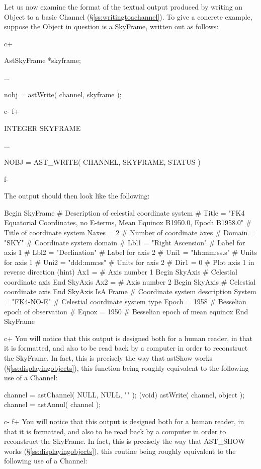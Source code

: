 \documentclass[twoside,11pt]{starlink}
\providecommand{\secref}[1]{\S\ref{#1}}
\begin{document}
{Let us now examine the format of the textual output produced by
writing an Object to a basic Channel
(\secref{ss:writingtoachannel}). To give a concrete example, suppose
the Object in question is a SkyFrame, written out as follows:

c+
\small
\begin{terminalv}
AstSkyFrame *skyframe;

...

nobj = astWrite( channel, skyframe );
\end{terminalv}
\normalsize
c-
f+
\small
\begin{terminalv}
      INTEGER SKYFRAME

      ...

      NOBJ = AST_WRITE( CHANNEL, SKYFRAME, STATUS )
\end{terminalv}
\normalsize
f-

The output should then look like the following:

\small
\begin{terminalv}
 Begin SkyFrame 	# Description of celestial coordinate system
#   Title = "FK4 Equatorial Coordinates, no E-terms, Mean Equinox B1950.0, Epoch B1958.0" 	# Title of coordinate system
    Naxes = 2 	# Number of coordinate axes
#   Domain = "SKY" 	# Coordinate system domain
#   Lbl1 = "Right Ascension" 	# Label for axis 1
#   Lbl2 = "Declination" 	# Label for axis 2
#   Uni1 = "hh:mm:ss.s" 	# Units for axis 1
#   Uni2 = "ddd:mm:ss" 	# Units for axis 2
#   Dir1 = 0 	# Plot axis 1 in reverse direction (hint)
    Ax1 = 	# Axis number 1
       Begin SkyAxis 	# Celestial coordinate axis
       End SkyAxis
    Ax2 = 	# Axis number 2
       Begin SkyAxis 	# Celestial coordinate axis
       End SkyAxis
 IsA Frame 	# Coordinate system description
    System = "FK4-NO-E" 	# Celestial coordinate system type
    Epoch = 1958 	# Besselian epoch of observation
#   Eqnox = 1950 	# Besselian epoch of mean equinox
 End SkyFrame
\end{terminalv}
\normalsize

c+
You will notice that this output is designed both for a human reader,
in that it is formatted, and also to be read back by a computer in
order to reconstruct the SkyFrame. In fact, this is precisely the way
that astShow works (\secref{ss:displayingobjects}), this function being
roughly equivalent to the following use of a Channel:

\small
\begin{terminalv}
channel = astChannel( NULL, NULL, "" );
(void) astWrite( channel, object );
channel = astAnnul( channel );
\end{terminalv}
\normalsize
c-
f+
You will notice that this output is designed both for a human reader,
in that it is formatted, and also to be read back by a computer in
order to reconstruct the SkyFrame. In fact, this is precisely the way
that AST\_SHOW works (\secref{ss:displayingobjects}), this routine
being roughly equivalent to the following use of a Channel:

}
\end{document}
